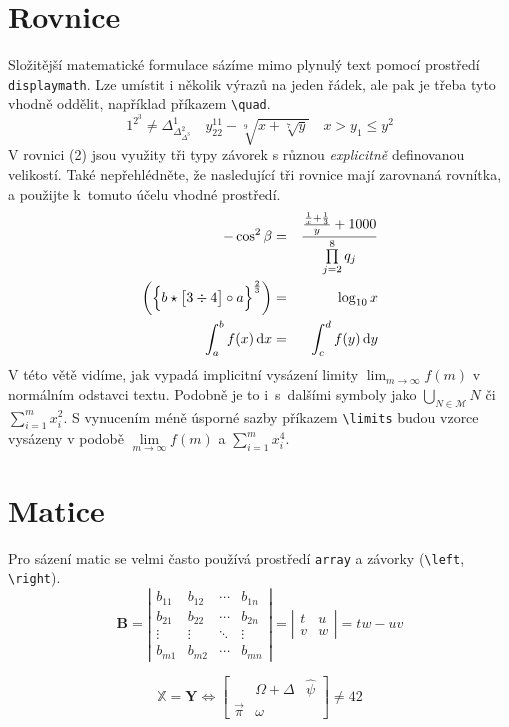 \documentclass[twocolumn,11pt]{article}
\theoremstyle{plain}
\theoremstyle{plain}
\begin{document}
\section{Rovnice}
Složitější matematické formulace sázíme mimo plynulý text pomocí prostředí \verb|displaymath|.
Lze umístit i několik výrazů na jeden řádek, ale pak je třeba tyto vhodně oddělit,
například příkazem \verb|\quad|.
$$
1^{2^3} \neq \Delta^1_{\Delta^2_{\Delta^3}} \quad
y^{11}_{22} - \sqrt[9]{x + \sqrt[7]{y}} \quad
x > y_1 \leq y^2
$$
V rovnici (2) jsou využity tři typy závorek s různou \emph{explicitně}
definovanou velikostí. Také nepřehlédněte, že nasledující tři rovnice mají zarovnaná
rovnítka, a použijte k~tomuto účelu vhodné prostředí.
\begin{eqnarray}
- \cos^2 \beta & = & \frac{\frac{\frac{1}{x} + \frac{1}{3}}{y} + 1000}{\prod\limits^8_{j = 2} q_j} \\
\biggl(\Bigl\{b \star \bigl[3 \div 4\bigr] \circ a \Bigr\}^{\frac{2}{3}}\biggr) & = & \log_{10} x \\
\int_a^b f(x) \,\mathrm{d}x & = & \int_c^d f(y) \,\mathrm{d}y
\end{eqnarray}
V této větě vidíme, jak vypadá
implicitní vysázení limity $\lim_{m \rightarrow \infty} f(m)$ v normálním odstavci textu. Podobně je to i~s~dalšími symboly
jako $\bigcup_{N \in \mathcal{M}}N$ či $\sum_{i=1}^m x_i^2$. S vynucením méně úsporné sazby příkazem \verb|\limits| budou vzorce vysázeny v podobě
$\lim\limits_{m \rightarrow \infty} f(m)$ a $\sum\limits_{i=1}^m x_i^4$.

\section{Matice}
Pro sázení matic se velmi často používá prostředí \texttt{array}
 a závorky (\verb|\left|, \verb|\right|).
$$
\mathbf{B} =
\left|
\begin{array}{cccc}
    b_{11} & b_{12} & \cdots & b_{1n} \\
    b_{21} & b_{22} & \cdots & b_{2n} \\
    \vdots & \vdots & \ddots & \vdots \\
    b_{m1} & b_{m2} & \cdots & b_{mn}
\end{array}
\right|
=
\left|
\begin{array}{cc}
    t & u \\
    v & w
\end{array}
\right|
=
tw - uv
$$

$$
\mathbb{X} = \mathbf{Y} \Longleftrightarrow \left[
\begin{array}{ccc}
      & \Omega + \Delta & \hat{\psi} \\
    \vec{\pi} & \omega &
\end{array}
\right]
\neq 42
$$
\end{document}

